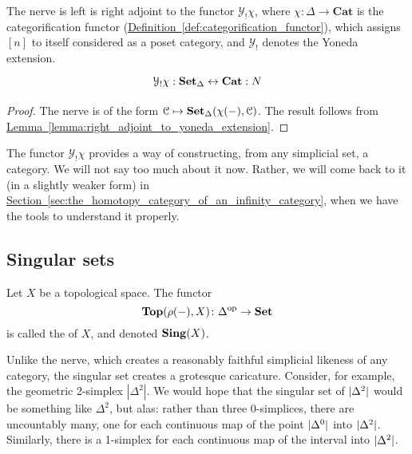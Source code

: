 \documentclass[main.tex]{subfiles}
\begin{document}
\begin{proposition}
  \label{prop:nerve_left_adjoint_to_yoneda_extension}
  The nerve is left is right adjoint to the functor $\mathcal{Y}_{!}\chi$, where $\chi\colon \Delta \to \mathbf{Cat}$ is the categorification functor (\hyperref[def:categorification_functor]{Definition~\ref*{def:categorification_functor}}), which assigns $[n]$ to itself considered as a poset category, and $\mathcal{Y}_{!}$ denotes the Yoneda extension.
  \begin{equation*}
    \begin{tikzcd}
      \mathcal{Y}_{!}\chi : \SSet \leftrightarrow \mathbf{Cat} : N
    \end{tikzcd}
  \end{equation*}
\end{proposition}
\begin{proof}
  The nerve is of the form $\mathcal{C} \mapsto \operatorname{\mathbf{Set}_{\Delta}}(\chi(-), \mathcal{C})$. The result follows from \hyperref[lemma:right_adjoint_to_yoneda_extension]{Lemma~\ref*{lemma:right_adjoint_to_yoneda_extension}}.
\end{proof}

The functor $\mathcal{Y}_{!}\chi$ provides a way of constructing, from any simplicial set, a category. We will not say too much about it now. Rather, we will come back to it (in a slightly weaker form) in \hyperref[sec:the_homotopy_category_of_an_infinity_category]{Section~\ref*{sec:the_homotopy_category_of_an_infinity_category}}, when we have the tools to understand it properly.

\subsection{Singular sets}
\label{ssc:singular_sets}

\begin{definition}
  \label{def:singular_set_of_a_topological_space}
  Let $X$ be a topological space. The functor
  \begin{equation*}
    \mathbf{Top}(\rho(-), X)\colon \Delta^{\mathrm{op}} \to \mathbf{Set}
  \end{equation*}
  is called the  of $X$, and denoted $\mathbf{Sing}(X)$.
\end{definition}

Unlike the nerve, which creates a reasonably faithful simplicial likeness of any category, the singular set creates a grotesque caricature. Consider, for example, the geometric 2-simplex $|\Delta^{2}|$. We would hope that the singular set of ${| \Delta^{2} |}$ would be something like $\Delta^{2}$, but alas: rather than three 0-simplices, there are uncountably many, one for each continuous map of the point ${| \Delta^{0} |}$ into ${| \Delta^{2} |}$. Similarly, there is a 1-simplex for each continuous map of the interval into ${| \Delta^{2} |}$.
\end{document}
